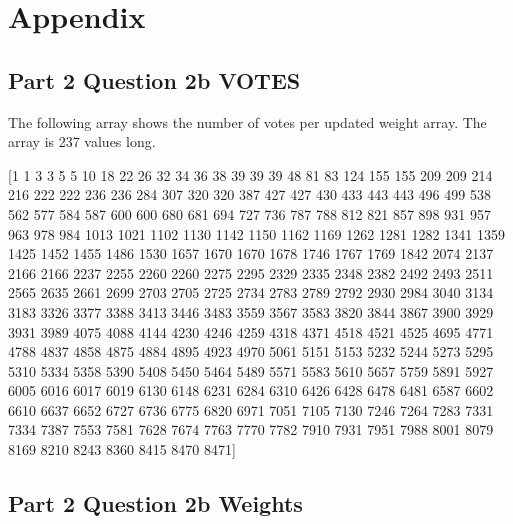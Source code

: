 \documentclass[12pt, fullpage,letterpaper]{article}
\begin{document}
\begin{enumerate}
\begin{enumerate}
\end{enumerate}

\section{Appendix}

\subsection{Part 2 Question 2b VOTES}

The following array shows the number of votes per updated weight array. The array is 237 values long.

[1 1 3 3 5 5 10 18 22 26 32 34 36 38 39 39 39 48 81 83 124 155 155 209 209 214 216 222 222 236 236 284 307 320 320 387 427 427 430 433 443 443 496 499 538 562 577 584 587 600 600 680 681 694 727 736 787 788 812 821 857 898 931 957 963 978 984 1013 1021 1102 1130 1142 1150 1162 1169 1262 1281 1282 1341 1359 1425 1452 1455 1486 1530 1657 1670 1670 1678 1746 1767 1769 1842 2074 2137 2166 2166 2237 2255 2260 2260 2275 2295 2329 2335 2348 2382 2492 2493 2511 2565 2635 2661 2699 2703 2705 2725 2734 2783 2789 2792 2930 2984 3040 3134 3183 3326 3377 3388 3413 3446 3483 3559 3567 3583 3820 3844 3867 3900 3929 3931 3989 4075 4088 4144 4230 4246 4259 4318 4371 4518 4521 4525 4695 4771 4788 4837 4858 4875 4884 4895 4923 4970 5061 5151 5153 5232 5244 5273 5295 5310 5334 5358 5390 5408 5450 5464 5489 5571 5583 5610 5657 5759 5891 5927 6005 6016 6017 6019 6130 6148 6231 6284 6310 6426 6428 6478 6481 6587 6602 6610 6637 6652 6727 6736 6775 6820 6971 7051 7105 7130 7246 7264 7283 7331 7334 7387 7553 7581 7628 7674 7763 7770 7782 7910 7931 7951 7988 8001 8079 8169 8210 8243 8360 8415 8470 8471]

\subsection{Part 2 Question 2b Weights}


\end{enumerate}
\end{document}
